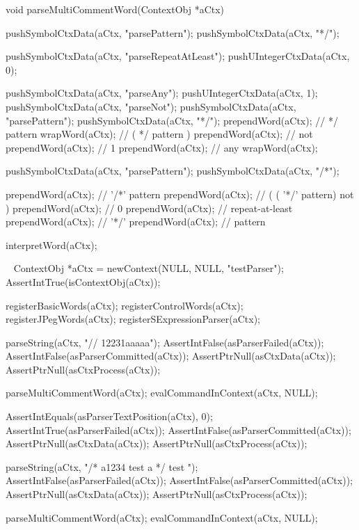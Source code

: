 \startCCode
void parseMultiCommentWord(ContextObj *aCtx) {

  pushSymbolCtxData(aCtx, "parsePattern");
  pushSymbolCtxData(aCtx, "*/");
  
  pushSymbolCtxData(aCtx, "parseRepeatAtLeast");
  pushUIntegerCtxData(aCtx, 0);
  
  pushSymbolCtxData(aCtx, "parseAny");
  pushUIntegerCtxData(aCtx, 1);
  pushSymbolCtxData(aCtx, "parseNot");
  pushSymbolCtxData(aCtx, "parsePattern");
  pushSymbolCtxData(aCtx, "*/");
  prependWord(aCtx); // */ pattern
  wrapWord(aCtx);    // ( */ pattern )
  prependWord(aCtx); // not
  prependWord(aCtx); // 1
  prependWord(aCtx); // any
  wrapWord(aCtx);
  
  pushSymbolCtxData(aCtx, "parsePattern");
  pushSymbolCtxData(aCtx, "/*");

  prependWord(aCtx); // '/*' pattern
  prependWord(aCtx); // ( ( '*/' pattern) not )
  prependWord(aCtx); // 0
  prependWord(aCtx); // repeat-at-least
  prependWord(aCtx); // '*/'
  prependWord(aCtx); // pattern

  interpretWord(aCtx);
}
\stopCCode

\CTestsSuiteSetup\
\startCTest
  ContextObj *aCtx = newContext(NULL, NULL, "testParser");
  AssertIntTrue(isContextObj(aCtx));
  
  registerBasicWords(aCtx);
  registerControlWords(aCtx);
  registerJPegWords(aCtx);
  registerSExpressionParser(aCtx);
\stopCTest

\startCTest
  parseString(aCtx, "// 12231aaaaa");
  AssertIntFalse(asParserFailed(aCtx));
  AssertIntFalse(asParserCommitted(aCtx));
  AssertPtrNull(asCtxData(aCtx));
  AssertPtrNull(asCtxProcess(aCtx));

  parseMultiCommentWord(aCtx);
  evalCommandInContext(aCtx, NULL);
  
  AssertIntEquals(asParserTextPosition(aCtx), 0);
  AssertIntTrue(asParserFailed(aCtx));
  AssertIntFalse(asParserCommitted(aCtx));
  AssertPtrNull(asCtxData(aCtx));
  AssertPtrNull(asCtxProcess(aCtx));
\stopCTest
\stopTestCase

\startCTest
  parseString(aCtx, "/* a1234 \n test a */ test ");
  AssertIntFalse(asParserFailed(aCtx));
  AssertIntFalse(asParserCommitted(aCtx));
  AssertPtrNull(asCtxData(aCtx));
  AssertPtrNull(asCtxProcess(aCtx));
  
  parseMultiCommentWord(aCtx);
  evalCommandInContext(aCtx, NULL);
  
